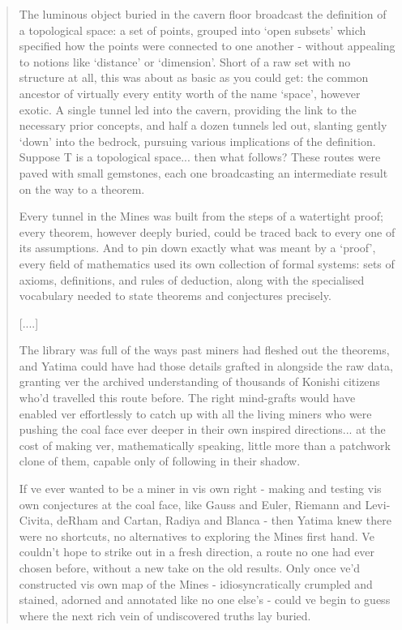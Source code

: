 \begin{quote}
  The luminous object buried in the cavern floor broadcast the
  definition of a topological space: a set of points, grouped into
  `open subsets' which specified how the points were connected to
  one another - without appealing to notions like `distance' or
  `dimension'.  Short of a raw set with no structure at all, this was
  about as basic as you could get: the common ancestor of virtually every
  entity worth of the name `space', however exotic.  A single tunnel led
  into the cavern, providing the link to the necessary prior concepts, and
  half a dozen tunnels led out, slanting gently `down' into the bedrock,
  pursuing various implications of the definition.  Suppose T is a
  topological space... then what follows?  These routes were paved with
  small gemstones, each one broadcasting an intermediate result on the way
  to a theorem.  

  Every tunnel in the Mines was built from the steps of a watertight
  proof; every theorem, however deeply buried, could be traced back to
  every one of its assumptions.  And to pin down exactly what was meant by
  a `proof', every field of mathematics used its own collection of formal
  systems: sets of axioms, definitions, and rules of deduction, along with
  the specialised vocabulary needed to state theorems and conjectures
  precisely.  

  [....]

  The library was full of the ways past miners had fleshed out the
  theorems, and Yatima could have had those details grafted in alongside
  the raw data, granting ver the archived understanding of thousands of
  Konishi citizens who'd travelled this route before.  The right
  mind-grafts would have enabled ver effortlessly to catch up with all
  the living miners who were pushing the coal face ever deeper in their
  own inspired directions... at the cost of making ver, mathematically
  speaking, little more than a patchwork clone of them, capable only of
  following in their shadow. 

  If ve ever wanted to be a miner in vis own right - making and testing
  vis own conjectures at the coal face, like Gauss and Euler, Riemann and
  Levi-Civita, deRham and Cartan, Radiya and Blanca - then Yatima knew
  there were no shortcuts, no alternatives to exploring the Mines first
  hand.  Ve couldn't hope to strike out in a fresh direction, a route no
  one had ever chosen before, without a new take on the old results.  Only
  once ve'd constructed vis own map of the Mines - idiosyncratically
  crumpled and stained, adorned and annotated like no one else's - could
  ve begin to guess where the next rich vein of undiscovered truths lay
  buried.  
\end{quote}
    
